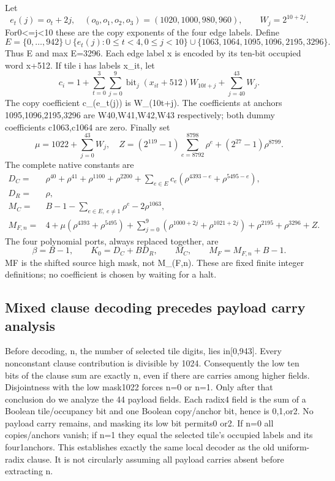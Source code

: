 \documentclass[
  10pt,
]{article}
\begin{document}
Let \[
 e_t(j)=o_t+2j,\quad (o_0,o_1,o_2,o_3)=(1020,1000,980,960),
 \qquad W_j=2^{10+2j}.
\] For0\textless=j\textless10 these are the copy exponents of the four
edge labels. Define \[
 E=\{0,\ldots,942\}\cup\{e_t(j):0\le t<4,0\le j<10\}
 \cup\{1063,1064,1095,1096,2195,3296\}.
\] Thus \textbar E and max E=3296. Each edge label x is
encoded by its ten-bit occupied word x+512. If tile i has labels x\_it,
let \[
 c_i=1+\sum_{t=0}^3\sum_{j=0}^9\operatorname{bit}_j(x_{it}+512)W_{10t+j}
       +\sum_{j=40}^{43}W_j.
\] The copy coefficient c\_(e\_t(j)) is W\_(10t+j). The coefficients at
anchors 1095,1096,2195,3296 are W40,W41,W42,W43 respectively; both dummy
coefficients c1063,c1064 are zero. Finally set \[
 \mu=1022+\sum_{j=0}^{43}W_j,
 \quad Z=(2^{119}-1)\sum_{e=8792}^{8798}\rho^e
          +(2^{27}-1)\rho^{8799}.
\] The complete native constants are \[
\begin{split}
 D_C={}&\rho^{40}+\rho^{41}+\rho^{1100}+\rho^{2200}
       +\sum_{e\in E}c_e(\rho^{4393-e}+\rho^{5495-e}),\\
 D_R={}&\rho,\\
 M_C={}&B-1-\sum_{e\in E,\ e\ne1}\rho^e-2\rho^{1063},\\
 M_{F,n}={}&4+\mu(\rho^{4393}+\rho^{5495})
       +\sum_{j=0}^9(\rho^{1000+2j}+\rho^{1021+2j})
       +\rho^{2195}+\rho^{3296}+Z.
\end{split}
\] The four polynomial ports, always replaced together, are \[
 \boxed{\beta=B-1,\qquad K_0=D_C+BD_R,\qquad M_C,
              \qquad M_F=M_{F,n}+B-1.}
\] MF is the shifted source high mask, not M\_(F,n). These are fixed
finite integer definitions; no coefficient is chosen by waiting for a
halt.

\subsection{Mixed clause decoding precedes payload carry
analysis}\label{mixed-clause-decoding-precedes-payload-carry-analysis}

Before decoding, n, the number of selected tile digits, lies
in{[}0,943{]}. Every nonconstant clause contribution is divisible by
1024. Consequently the low ten bits of the clause sum are exactly n,
even if there are carries among higher fields. Disjointness with the low
mask1022 forces n=0 or n=1. Only after that conclusion do we analyze the
44 payload fields. Each radix4 field is the sum of a Boolean
tile/occupancy bit and one Boolean copy/anchor bit, hence is 0,1,or2. No
payload carry remains, and masking its low bit permits0 or2. If n=0 all
copies/anchors vanish; if n=1 they equal the selected tile's occupied
labels and its four1anchors. This establishes exactly the same local
decoder as the old uniform-radix clause. It is not circularly assuming
all payload carries absent before extracting n.
\end{document}
